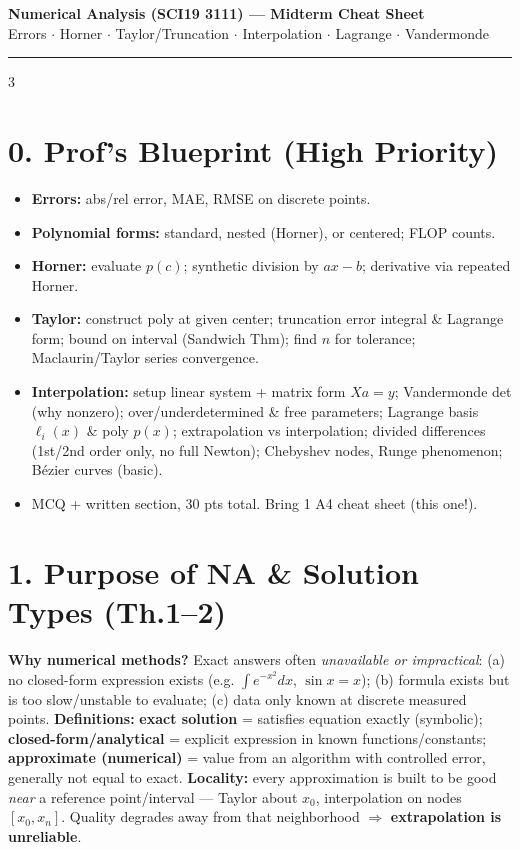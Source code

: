 \documentclass[9pt]{extarticle}
\newcommand{\hl}[1]{\textbf{\textcolor{BrickRed}{#1}}}
\newcommand{\sepline}{\vspace{1pt}\hrule\vspace{2pt}}
\begin{document}
\footnotesize

\begin{center}
{\bfseries\large Numerical Analysis (SCI19 3111) --- Midterm Cheat Sheet}\\
{\scriptsize Errors $\cdot$ Horner $\cdot$ Taylor/Truncation $\cdot$ Interpolation $\cdot$ Lagrange $\cdot$ Vandermonde}
\end{center}
\sepline

\begin{multicols}{3}

\section{0. Prof's Blueprint (High Priority)}
\begin{itemize}
\item \hl{Errors:} abs/rel error, MAE, RMSE on discrete points.
\item \hl{Polynomial forms:} standard, nested (Horner), or centered; FLOP counts.
\item \hl{Horner:} evaluate $p(c)$; synthetic division by $ax-b$; derivative via repeated Horner.
\item \hl{Taylor:} construct poly at given center; truncation error integral \& Lagrange form; bound on interval (Sandwich Thm); find $n$ for tolerance; Maclaurin/Taylor series convergence.
\item \hl{Interpolation:} setup linear system + matrix form $Xa=y$; Vandermonde det (why nonzero); over/underdetermined \& free parameters; Lagrange basis $\ell_i(x)$ \& poly $p(x)$; extrapolation vs interpolation; divided differences (1st/2nd order only, no full Newton); Chebyshev nodes, Runge phenomenon; Bézier curves (basic).
\item MCQ + written section, 30 pts total. Bring 1 A4 cheat sheet (this one!).
\end{itemize}

\section{1. Purpose of NA \& Solution Types (Th.1--2)}
\hl{Why numerical methods?} Exact answers often \emph{unavailable or impractical}: (a) no closed-form expression exists (e.g. $\int e^{-x^2}dx$, $\sin x=x$); (b) formula exists but is too slow/unstable to evaluate; (c) data only known at discrete measured points.
\hl{Definitions:} \textbf{exact solution} = satisfies equation exactly (symbolic); \textbf{closed-form/analytical} = explicit expression in known functions/constants; \textbf{approximate (numerical)} = value from an algorithm with controlled error, generally not equal to exact.
\hl{Locality:} every approximation is built to be good \emph{near} a reference point/interval — Taylor about $x_0$, interpolation on nodes $[x_0,x_n]$. Quality degrades away from that neighborhood $\Rightarrow$ \hl{extrapolation is unreliable}.


\end{multicols}
\end{document}
